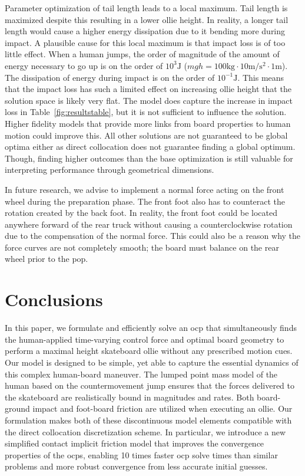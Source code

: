 \documentclass[default,iicol]{sn-jnl}
\begin{document}
Parameter optimization of tail length leads to a local maximum.
Tail length is maximized despite this resulting in a lower ollie height.
In reality, a longer tail length would cause a higher energy dissipation due to it bending more during impact.
A plausible cause for this local maximum is that impact loss is of too little effect.
When a human jumps, the order of magnitude of the amount of energy necessary to go up is on the order of $10^3\si{\joule}$ ($mgh=100\si{\kilo\gram}\cdot10\si{\meter\per\second\squared}\cdot1\si{\meter}$). The dissipation of energy during impact is on the order of $10^{-1}\si{\joule}$.
This means that the impact loss has such a limited effect on increasing ollie height that the solution space is likely very flat.
The model does capture the increase in impact loss in Table~\ref{fig:resultstable}, but it is not sufficient to influence the solution. Higher fidelity models that provide more links from board properties to human motion could improve this.
All other solutions are not guaranteed to be global optima either as direct collocation does not guarantee finding a global optimum.
Though, finding higher outcomes than the base optimization is still valuable for interpreting performance through geometrical dimensions.

In future research, we advise to implement a normal force acting on the front wheel during the preparation phase.
The front foot also has to counteract the rotation created by the back foot. 
In reality, the front foot could be located anywhere forward of the rear truck without causing a counterclockwise rotation due to the compensation of the normal force.
This could also be a reason why the force curves are not completely smooth; the board must balance on the rear wheel prior to the pop.

\section{Conclusions}
In this paper, we formulate and efficiently solve an \gls{ocp} that simultaneously finds the human-applied time-varying control force and optimal board geometry to perform a maximal height skateboard ollie without any prescribed motion cues. Our model is designed to be simple, yet able to capture the essential dynamics of this complex human-board maneuver. The lumped point mass model of the human based on the countermovement jump ensures that the forces delivered to the skateboard are realistically bound in magnitudes and rates. Both board-ground impact and foot-board friction are utilized when executing an ollie. Our formulation makes both of these discontinuous model elements compatible with the direct collocation discretization scheme. In particular, we introduce a new simplified contact implicit friction model that improves the convergence properties of the \glspl{ocp}, enabling 10 times faster \gls{ocp} solve times than similar problems and more robust convergence from less accurate initial guesses.
\end{document}
